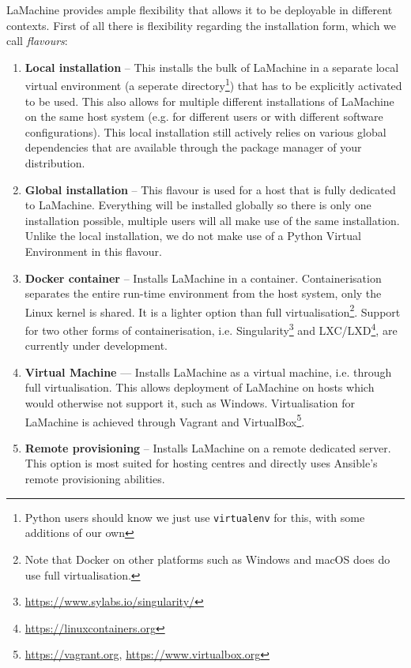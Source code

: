 \documentclass[a4paper,11pt]{article}
\begin{document}
LaMachine provides ample flexibility that allows it to be deployable in different contexts. First of all there is
flexibility regarding the installation form, which we call \emph{flavours}:

\begin{enumerate}
    \item \textbf{Local installation} -- This installs the bulk of LaMachine in a separate local virtual environment (a seperate
        directory\footnote{Python users should know we just use \texttt{virtualenv} for this, with some
        additions of our own}) that has to be explicitly activated to be used. This also allows for multiple different installations
        of LaMachine on the same host system (e.g. for different users or with different software configurations).
        This local installation still actively relies on various global dependencies that are available through the
        package manager of your distribution.
    \item \textbf{Global installation} -- This flavour is used for a host that is fully dedicated to LaMachine. Everything will be
        installed globally so there is only one installation possible, multiple users will all make use of the same
        installation. Unlike the local installation, we do not make use of a Python Virtual Environment in this flavour.
    \item \textbf{Docker container} -- Installs LaMachine in a container. Containerisation separates the entire run-time
        environment from the host system, only the Linux kernel is shared. It is a lighter option than full
        virtualisation\footnote{Note that Docker on other platforms such as Windows and macOS does do use full
        virtualisation.}.  Support for two other forms of containerisation, i.e. Singularity\footnote{\url{https://www.sylabs.io/singularity/}} and
            LXC/LXD\footnote{\url{https://linuxcontainers.org}}, are currently under development.
    \item \textbf{Virtual Machine} --- Installs LaMachine as a virtual machine, i.e. through full virtualisation. This allows
        deployment of LaMachine on hosts which would otherwise not support it, such as Windows. Virtualisation for
        LaMachine is achieved through Vagrant and VirtualBox\footnote{\url{https://vagrant.org}, \url{https://www.virtualbox.org}}.
    \item \textbf{Remote provisioning} -- Installs LaMachine on a remote dedicated server. This option is most suited for
        hosting centres and directly uses Ansible's remote provisioning abilities.
\end{enumerate}
\end{document}
